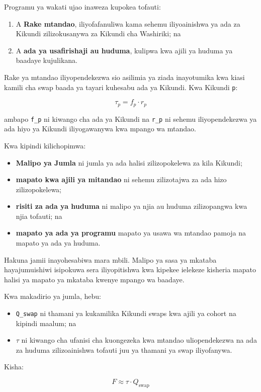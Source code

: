 \documentclass[11pt]{article}
\begin{document}
Programu ya wakati ujao inaweza kupokea tofauti:

\begin{enumerate}[leftmargin=*]
\item A \textbf{Rake mtandao}, iliyofafanuliwa kama sehemu iliyoainishwa ya ada za Kikundi zilizokusanywa za Kikundi cha Washiriki; na
\item A \textbf{ada ya usafirishaji au huduma}, kulipwa kwa ajili ya huduma ya baadaye kujulikana.
\end{enumerate}
Rake ya mtandao iliyopendekezwa sio asilimia ya ziada inayotumika kwa kiasi kamili cha swap baada ya tayari kuhesabu ada ya Kikundi. Kwa Kikundi \texttt{p}:

\[
\tau_p = f_p \cdot r_p
\]

ambapo \texttt{f\_p} ni kiwango cha ada ya Kikundi na \texttt{r\_p} ni sehemu iliyopendekezwa ya ada hiyo ya Kikundi iliyogawanywa kwa mpango wa mtandao.

Kwa kipindi kilichopimwa:

\begin{itemize}[leftmargin=*]
\item \textbf{Malipo ya Jumla} ni jumla ya ada halisi zilizopokelewa za kila Kikundi;
\item \textbf{mapato kwa ajili ya mitandao} ni sehemu zilizotajwa za ada hizo zilizopokelewa;
\item \textbf{risiti za ada ya huduma} ni malipo ya njia au huduma zilizopangwa kwa njia tofauti; na
\item \textbf{mapato ya ada ya programu} mapato ya usawa wa mtandao pamoja na mapato ya ada ya huduma.
\end{itemize}
Hakuna jamii inayohesabiwa mara mbili. Malipo ya sasa ya mkataba hayajumuishiwi isipokuwa sera iliyopitishwa kwa kipekee ielekeze kisheria mapato halisi ya mapato ya mkataba kwenye mpango wa baadaye.

Kwa makadirio ya jumla, hebu:

\begin{itemize}[leftmargin=*]
\item \texttt{Q\_swap} ni thamani ya kukamilika Kikundi swaps kwa ajili ya cohort na kipindi maalum; na
\item \texttt{$\tau$} ni kiwango cha ufanisi cha kuongezeka kwa mtandao uliopendekezwa na ada za huduma zilizoainishwa tofauti juu ya thamani ya swap iliyofanywa.
\end{itemize}
Kisha:

\[
F \approx \tau \cdot Q_{\mathrm{swap}}
\]
\end{document}
